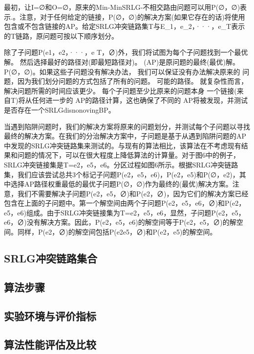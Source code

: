 最初，让I=∅和O=∅，原来的Min-MinSRLG-不相交路由问题可以用P(∅，∅)表示.。注意，对于任何给定的链接，P(∅，∅)的解决方案(如果它存在的话)将使用包含或不包含链接的AP。给定SRLG冲突链路集T与E_1，e_2，···，e_T表示的T链路，原问题可按以下顺序划分。

除了子问题P({e1，e2，···，e T}，∅)外，我们将试图为每个子问题找到一个最优解。
然后选择最好的路径对(即最短路径对)。
(AP)是原问题的最终(最优)解。
P(∅，∅)。如果这些子问题没有解决办法，
我们可以保证没有办法解决原来的
问题，因为我们划分问题的方式包括了所有的问题。
可能的路径。
就复杂性而言，解决问题所需的时间应该更少。
每个子问题至少比原来的问题本身
一个链接(来自T)将从任何进一步的
AP的路径计算，这也确保了不同的
AP将被发现，并测试是否存在一个SRLGdisnonovingBP。

当遇到陷阱问题时，我们的解决方案将原来的问题划分，并测试每个子问题以寻找最终的解决方案。在我们的分治解决方案中，子问题是基于从遇到陷阱问题的AP中发现的SRLG冲突链路集来测试的。与现有的算法相比，该算法在不考虑现有结果和问题的情况下，可以在很大程度上降低算法的计算量。对于图6中的例子，SRLG冲突链接集是T={e2，e5，e6}。分区过程如图6所示。根据SRLG冲突链路集，我们应该尝试总共3个标记子问题P({e2，e5}，{e6})，P({e2}，{e5})和P(∅，{e2})，其中选择AP路径权重最低的最优子问题P(∅，∅)作为最终的(最优)解决方案。注意，我们不需要解决子问题P({e2，e5}，∅)和P({e2}，∅)，因为它们的解决方案已经包含在上面的子问题中。第一个解空间由两个子问题P({e2，e5，e6}，∅)和P({e2，e5}，{e6})组成。由于SRLG冲突链接集为T={e2，e5，e6}，显然，子问题P({e2，e5，e6}，∅)没有解决方案。因此，P({e2，e5}，{e6})的解空间等于P({e2，e5}，∅)的解空间。同样，P({e2}，∅)的解空间包括P({e2}{e5}，∅)和P({e2}，{e5})的解空间。





\subsection{SRLG冲突链路集合}
\subsection{算法步骤}
\subsection{实验环境与评价指标}
\subsection{算法性能评估及比较}

